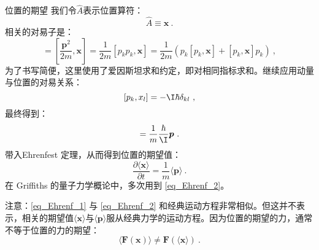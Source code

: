 \begin{example}{位置的期望}
我们令$\hat A$表示位置算符：
\begin{equation}
\hat A \equiv \boldsymbol{x}~.
\end{equation}
相关的对易子是：
\begin{equation}
[\hat H, \boldsymbol{x}]=\left[\frac{\boldsymbol{p}^2}{2 m}, \boldsymbol{x}\right]=\frac{1}{2 m}\left[p_k p_k, \boldsymbol{x}\right]=\frac{1}{2 m}\left(p_k\left[p_k, \boldsymbol{x}\right]+\left[p_k, \boldsymbol{x}\right] p_k\right)~,
\end{equation}
为了书写简便，这里使用了爱因斯坦求和约定，即对相同指标求和。继续应用动量与位置的对易关系：
\begin{equation}
\left[p_k, x_l\right]=-\I \hbar \delta_{k l}~,
\end{equation}
最终得到：
\begin{equation}
[\hat H, \boldsymbol{x}]=\frac{1}{m} \frac{\hbar}{\I} \boldsymbol{p}~.
\end{equation}
带入Ehrenfest 定理，从而得到位置的期望值：
\begin{equation}\label{eq_Ehrenf_2}
\frac{\partial\langle\boldsymbol{x}\rangle}{\partial t}=\frac{1}{m}\langle\boldsymbol{p}\rangle ~.
\end{equation}
在 Griffiths 的量子力学概论\cite{GriffQ}中，多次用到 \autoref{eq_Ehrenf_2}。
\end{example}

注意：\autoref{eq_Ehrenf_1} 与 \autoref{eq_Ehrenf_2} 和经典运动方程非常相似。但这并不表示，相关的期望值$\langle\boldsymbol{x}\rangle$与$\langle\boldsymbol{p}\rangle$服从经典力学的运动方程。因为位置的期望的力，通常不等于位置的力的期望：
\begin{equation}
\langle\boldsymbol{F}(\boldsymbol{x})\rangle \ne \boldsymbol{F}(\langle\boldsymbol{x}\rangle)~.
\end{equation}